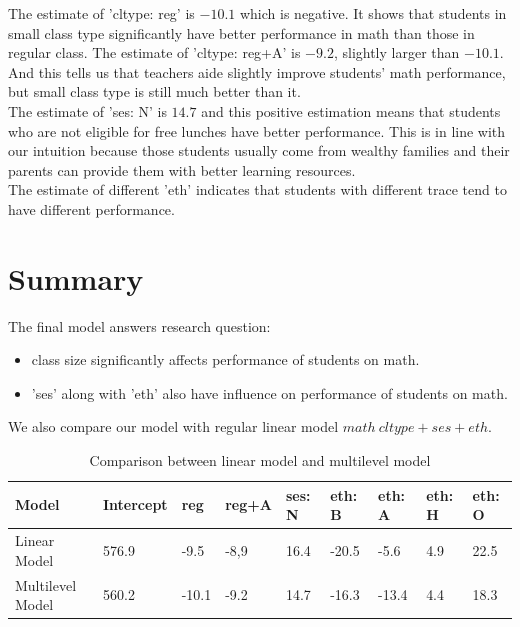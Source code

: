 \documentclass{article}
\begin{document}
The estimate of 'cltype: reg' is $-10.1$ which is negative. It shows that students in small class type significantly have better 
performance in math than those in regular class. The estimate of 'cltype: reg+A' is $-9.2$, slightly larger than $-10.1$. 
And this tells us that teachers aide slightly improve students’ math performance, but small class type is still much better than it.\\

The estimate of 'ses: N' is $14.7$ and this positive estimation means that students who are not eligible for free lunches have
better performance. This is in line with our intuition because those students usually come from wealthy families and their 
parents can provide them with better learning resources.\\

The estimate of different 'eth' indicates that students with different trace tend to have different performance.\\

\section{Summary}

The final model answers research question: 
\begin{itemize}
    \item class size significantly affects performance of students on math.
    \item 'ses' along with 'eth' also have influence on performance of students on math.
\end{itemize}

We also compare our model with regular linear model $math ~ cltype + ses + eth$.

\begin{table}[h]
    \centering
    \caption{Comparison between linear model and multilevel model}
    \label{tab:lm}
    \begin{tabular}{|l|l|l|l|l|l|l|l|l|}
    \hline
    Model            & Intercept & reg         & reg+A         & ses: N & eth: B & eth: A & eth:  H & eth: O \\ \hline
    Linear Model     & 576.9     & -9.5        & -8,9          & 16.4   & -20.5  & -5.6   & 4.9     & 22.5   \\ \hline
    Multilevel Model & 560.2     & -10.1       & -9.2          & 14.7   & -16.3  & -13.4  & 4.4     & 18.3   \\ \hline
    \end{tabular}
\end{table}
\end{document}

